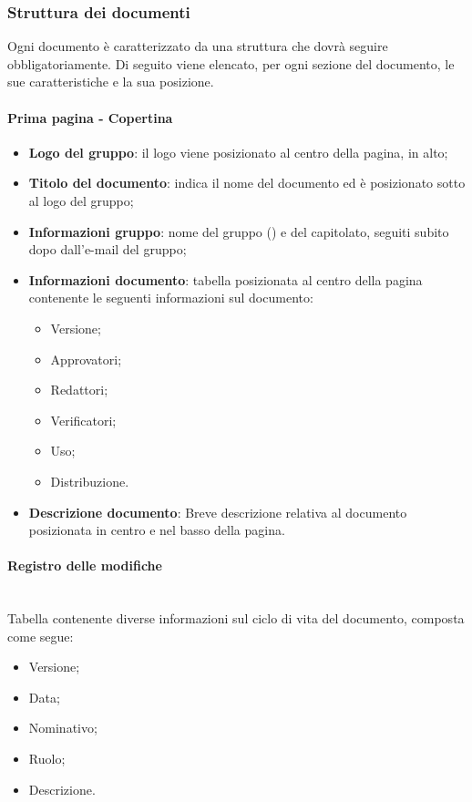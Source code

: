 \subsubsection{Struttura dei documenti}
Ogni documento è caratterizzato da una struttura che dovrà seguire obbligatoriamente.
Di seguito viene elencato, per ogni sezione del documento, le sue caratteristiche e la sua posizione.

\paragraph{Prima pagina - Copertina}\mbox{}
\begin{itemize}
\item \textbf{Logo del gruppo}: il logo viene posizionato al centro della pagina, in alto;
\item \textbf{Titolo del documento}: indica il nome del documento ed è posizionato sotto al logo del gruppo;
\item \textbf{Informazioni gruppo}: nome del gruppo (\Gruppo{}) e del capitolato, seguiti subito dopo dall'e-mail del gruppo; 
\item \textbf{Informazioni documento}: tabella posizionata al centro della pagina contenente le seguenti informazioni sul documento:
\begin{itemize}
\item Versione;
\item Approvatori;
\item Redattori;
\item Verificatori;
\item Uso;
\item Distribuzione.
\end{itemize}
\item \textbf{Descrizione documento}: Breve descrizione relativa al documento posizionata in centro e nel basso della pagina.
\end{itemize}

\paragraph{Registro delle modifiche} \mbox{} \\
Tabella contenente diverse informazioni sul ciclo di vita del documento, composta come segue:
\begin{itemize}
\item Versione;
\item Data;
\item Nominativo;
\item Ruolo;
\item Descrizione.
\end{itemize}

